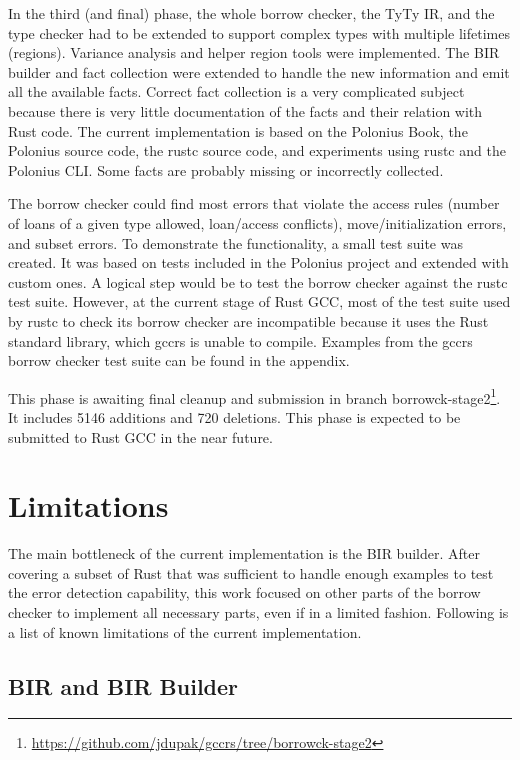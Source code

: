 \documentclass[
  11pt,
  twoside,symmetric]{report}
\DeclareRobustCommand{\href}[2]{#2\footnote{\url{#1}}}
\begin{document}
In the third (and final) phase, the whole borrow checker, the TyTy IR,
and the type checker had to be extended to support complex types with
multiple lifetimes (regions). Variance analysis and helper region tools
were implemented. The BIR builder and fact collection were extended to
handle the new information and emit all the available facts. Correct
fact collection is a very complicated subject because there is very
little documentation of the facts and their relation with Rust code. The
current implementation is based on the Polonius
Book, the Polonius source
code, the rustc source
code, and experiments using rustc
and the Polonius CLI. Some facts are probably missing or incorrectly
collected.

The borrow checker could find most errors that violate the access rules
(number of loans of a given type allowed, loan/access conflicts),
move/initialization errors, and subset errors. To demonstrate the
functionality, a small test suite was created. It was based on tests
included in the Polonius project and extended with custom ones. A
logical step would be to test the borrow checker against the rustc test
suite. However, at the current stage of Rust GCC, most of the test suite
used by rustc to check its borrow checker are incompatible because it
uses the Rust standard library, which gccrs is unable to compile.
Examples from the gccrs borrow checker test suite can be found in the
appendix.

This phase is awaiting final cleanup and submission in branch
\href{https://github.com/jdupak/gccrs/tree/borrowck-stage2}{borrowck-stage2}.
It includes 5146 additions and 720 deletions. This phase is expected to
be submitted to Rust GCC in the near future.

\section{Limitations}\label{limitations}

The main bottleneck of the current implementation is the BIR builder.
After covering a subset of Rust that was sufficient to handle enough
examples to test the error detection capability, this work focused on
other parts of the borrow checker to implement all necessary parts, even
if in a limited fashion. Following is a list of known limitations of the
current implementation.

\subsection{BIR and BIR Builder}\label{sec:bir-and-bir-builder}
\end{document}
